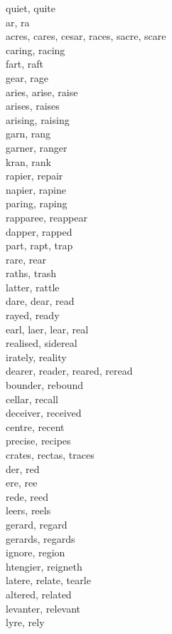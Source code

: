 quiet, quite\\
ar, ra\\
acres, cares, cesar, races, sacre, scare\\
caring, racing\\
fart, raft\\
gear, rage\\
aries, arise, raise\\
arises, raises\\
arising, raising\\
garn, rang\\
garner, ranger\\
kran, rank\\
rapier, repair\\
napier, rapine\\
paring, raping\\
rapparee, reappear\\
dapper, rapped\\
part, rapt, trap\\
rare, rear\\
raths, trash\\
latter, rattle\\
dare, dear, read\\
rayed, ready\\
earl, laer, lear, real\\
realised, sidereal\\
irately, reality\\
dearer, reader, reared, reread\\
bounder, rebound\\
cellar, recall\\
deceiver, received\\
centre, recent\\
precise, recipes\\
crates, rectas, traces\\
der, red\\
ere, ree\\
rede, reed\\
leers, reels\\
gerard, regard\\
gerards, regards\\
ignore, region\\
htengier, reigneth\\
latere, relate, tearle\\
altered, related\\
levanter, relevant\\
lyre, rely\\
